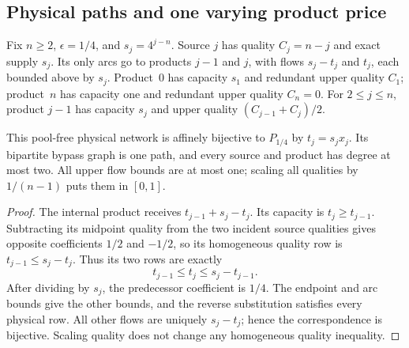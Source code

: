 \subsection{Physical paths and one varying product price}\label{s6:physical-paths}
Fix $n\ge2$, $\epsilon=1/4$, and $s_j=4^{j-n}$. Source $j$ has
quality $C_j=n-j$ and exact supply $s_j$. Its only arcs go to products
$j-1$ and $j$, with flows $s_j-t_j$ and $t_j$, each bounded above by
$s_j$. Product~0 has capacity $s_1$ and redundant upper quality $C_1$;
product~$n$ has capacity one and redundant upper quality $C_n=0$.
For $2\le j\le n$, product $j-1$ has capacity $s_j$ and upper quality
$(C_{j-1}+C_j)/2$.

\begin{proposition}\label{s6:path-realization}
This pool-free physical network is affinely bijective to $P_{1/4}$ by
$t_j=s_jx_j$. Its bipartite bypass graph is one path, and every source
and product has degree at most two. All upper flow bounds are at most
one; scaling all qualities by $1/(n-1)$ puts them in $[0,1]$.
\end{proposition}
\begin{proof}
The internal product receives $t_{j-1}+s_j-t_j$. Its capacity is
$t_j\ge t_{j-1}$. Subtracting its midpoint quality from the two
incident source qualities gives opposite coefficients $1/2$ and
$-1/2$, so its homogeneous quality row is
$t_{j-1}\le s_j-t_j$. Thus its two rows are exactly
\begin{equation}
 t_{j-1}\le t_j\le s_j-t_{j-1}.\label{s6:physical-strip}
\end{equation}
After dividing by $s_j$, the predecessor coefficient is $1/4$.
The endpoint and arc bounds give the other bounds, and the reverse
substitution satisfies every physical row. All other flows are uniquely
$s_j-t_j$; hence the correspondence is bijective. Scaling quality does
not change any homogeneous quality inequality.
\end{proof}

